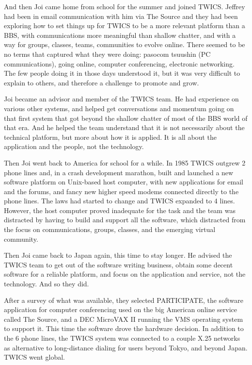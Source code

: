And then Joi came home from school for the summer and joined TWICS. Jeffrey had been in email communication with him via The Source and they had been exploring how to set things up for TWICS to be a more relevant platform than a BBS, with communications more meaningful than shallow chatter, and with a way for groups, classes, teams, communities to evolve online. There seemed to be no terms that captured what they were doing: pasocom tsuushin (PC communications), going online, computer conferencing, electronic networking. The few people doing it in those days understood it, but it was very difficult to explain to others, and therefore a challenge to promote and grow.

Joi became an advisor and member of the TWICS team. He had experience on various other systems, and helped get conversations and momentum going on that first system that got beyond the shallow chatter of most of the BBS world of that era. And he helped the team understand that it is not necessarily about the technical platform, but more about how it is applied. It is all about the application and the people, not the technology.

Then Joi went back to America for school for a while. In 1985 TWICS outgrew 2 phone lines and, in a crash development marathon, built and launched a new software platform on Unix-based host computer, with new applications for email and the forums, and fancy new higher speed modems connected directly to the phone lines. The laws had started to change and TWICS expanded to 4 lines. However, the host computer proved inadequate for the task and the team was distracted by having to build and support all the software, which distracted from the focus on communications, groups, classes, and the emerging virtual community.

Then Joi came back to Japan again, this time to stay longer. He advised the TWICS team to get out of the software writing business, obtain some decent software for a reliable platform, and focus on the application and service, not the technology. And so they did.

After a survey of what was available, they selected PARTICIPATE, the software application for computer conferencing used on the big American online service called The Source, and a DEC MicroVAX II running the VMS operating system to support it. This time the software drove the hardware decision. In addition to the 6 phone lines, the TWICS system was connected to a couple X.25 networks as alternative to long-distance dialing for users beyond Tokyo, and beyond Japan. TWICS went global.

